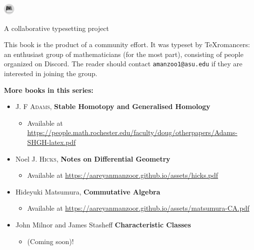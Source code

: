 \documentclass[../main]{subfiles}
\begin{document}

\newpage
\thispagestyle{empty}

\begin{center}
    \Huge{
    \includegraphics[height=1.5em]{texromancers_gray.pdf}
    }
    
    \normalsize{A collaborative typesetting project}
\end{center}

\noindent\makebox[\linewidth]{\rule{\linewidth}{0.4pt}}

\bigskip

This book is the product of a community effort. It was typeset by \TeX{}romancers: an enthusiast group of mathematicians (for the most part), consisting of people organized on Discord. The reader should contact \texttt{amanzoo1@asu.edu} if they are interested in joining the group.

\noindent\makebox[\linewidth]{\rule{\linewidth}{0.4pt}}

\bigskip

\noindent\textbf{More books in this series:}
\begin{itemize}
    \item J. F \textsc{Adams}, \textbf{Stable Homotopy and Generalised Homology}
        \begin{itemize}
            \item Available at \url{https://people.math.rochester.edu/faculty/doug/otherpapers/Adams-SHGH-latex.pdf}
        \end{itemize}
    \item Noel J. \textsc{Hicks}, \textbf{Notes on Differential Geometry}
        \begin{itemize}
            \item Available at \url{https://aareyanmanzoor.github.io/assets/hicks.pdf}
        \end{itemize}
    \item Hideyuki Matsumura, \textbf{Commutative Algebra}
        \begin{itemize}
            \item Available at \url{https://aareyanmanzoor.github.io/assets/matsumura-CA.pdf}
        \end{itemize}
    \item John Milnor and James Stasheff \textbf{Characteristic Classes}
    \begin{itemize}
        \item (Coming soon)!
    \end{itemize}
\end{itemize}

\vfill
\end{document}
